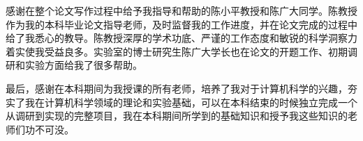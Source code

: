 
\begin{acknowledgements}

  感谢在整个论文写作过程中给予我指导和帮助的陈小平教授和陈广大同学。陈教授作为我的本科毕业论文指导老师，及时监督我的工作进度，并在论文完成的过程中给了我悉心的教导。陈教授深厚的学术功底、严谨的工作态度和敏锐的科学洞察力着实使我受益良多。实验室的博士研究生陈广大学长也在论文的开题工作、初期调研和实验方面给我了很多帮助。

  最后，感谢在本科期间为我授课的所有老师，培养了我对于计算机科学的兴趣，夯实了我在计算机科学领域的理论和实验基础，可以在本科结束的时候独立完成一个从调研到实现的完整项目，我在本科期间所学到的基础知识和授予我这些知识的老师们功不可没。


\end{acknowledgements}

